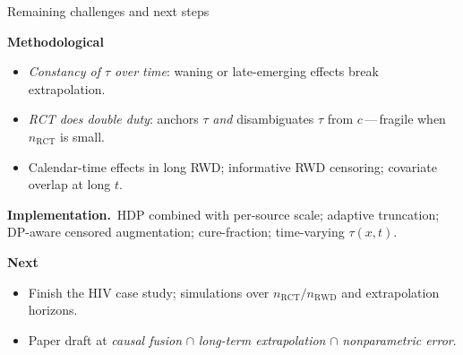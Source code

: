 \documentclass[10pt,aspectratio=169]{beamer}
\newcommand{\CATE}{\tau}
\newcommand{\cf}{c}
\begin{document}
\begin{frame}{Remaining challenges and next steps}

\textbf{Methodological}
\begin{itemize}
  \item \emph{Constancy of $\CATE$ over time}: waning or late-emerging
        effects break extrapolation.
  \item \emph{RCT does double duty}: anchors $\CATE$ \emph{and}
        disambiguates $\CATE$ from $\cf$\,---\,fragile when
        $n_{\mathrm{RCT}}$ is small.
  \item Calendar-time effects in long RWD; informative RWD censoring;
        covariate overlap at long $t$.
\end{itemize}

\textbf{Implementation.}\ HDP combined with per-source scale; adaptive
truncation; DP-aware censored augmentation; cure-fraction;
time-varying $\CATE(x, t)$.

\textbf{Next}
\begin{itemize}
  \item Finish the HIV case study; simulations over
        $n_{\mathrm{RCT}}/n_{\mathrm{RWD}}$ and extrapolation horizons.
  \item Paper draft at \emph{causal fusion} $\cap$
        \emph{long-term extrapolation} $\cap$ \emph{nonparametric
        error}.
\end{itemize}

\end{frame}
\end{document}
